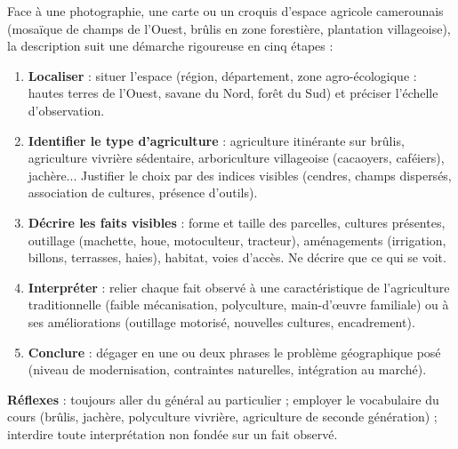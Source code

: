 \documentclass[11pt]{article}
\newcommand{\cle}[1]{{\popxbold\color{popdark}#1}}
\begin{document}
\begin{methode}
Face à une photographie, une carte ou un croquis d'espace agricole camerounais (mosaïque de champs de l'Ouest, brûlis en zone forestière, plantation villageoise), la description suit une démarche rigoureuse en cinq étapes :
\begin{enumerate}
\item \textbf{Localiser} : situer l'espace (région, département, zone agro-écologique : hautes terres de l'Ouest, savane du Nord, forêt du Sud) et préciser l'échelle d'observation.
\item \textbf{Identifier le type d'agriculture} : agriculture itinérante sur brûlis, agriculture vivrière sédentaire, arboriculture villageoise (cacaoyers, caféiers), jachère... Justifier le choix par des indices visibles (cendres, champs dispersés, association de cultures, présence d'outils).
\item \textbf{Décrire les faits visibles} : forme et taille des parcelles, cultures présentes, outillage (machette, houe, motoculteur, tracteur), aménagements (irrigation, billons, terrasses, haies), habitat, voies d'accès. Ne décrire que ce qui se voit.
\item \textbf{Interpréter} : relier chaque fait observé à une caractéristique de l'agriculture traditionnelle (faible mécanisation, polyculture, main-d'œuvre familiale) ou à ses améliorations (outillage motorisé, nouvelles cultures, encadrement).
\item \textbf{Conclure} : dégager en une ou deux phrases le problème géographique posé (niveau de modernisation, contraintes naturelles, intégration au marché).
\end{enumerate}
\textbf{Réflexes} : toujours aller du général au particulier ; employer le vocabulaire du cours (\cle{brûlis}, \cle{jachère}, \cle{polyculture vivrière}, \cle{agriculture de seconde génération}) ; interdire toute interprétation non fondée sur un fait observé.
\end{methode}
\end{document}
